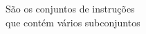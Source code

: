 \documentclass[preview]{standalone}
\begin{document}
São os conjuntos de instruções\\ que contém vários subconjuntos\\
\end{document}
